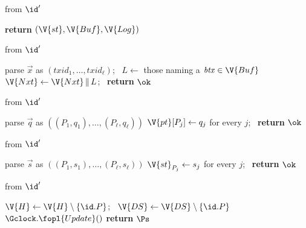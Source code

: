\begin{interface}
{ \quad from $\id'$
\begin{algorithmic}[1]
\algcont
{}
\State \textbf{return} $(\V{st}, \V{Buf}, \V{Log})$ \label{ln:gledadvread}
\algsave
\end{algorithmic}
\vspace{1.4ex}

 \quad from $\id'$
\begin{algorithmic}[1]
\algcont
{}
\State parse $\vec{x}$ as $(\mathit{txid}_1, \ldots, \mathit{txid}_\ell)$; \ $L \gets$ those naming a $\mathit{btx} \in \V{Buf}$ \label{ln:gledpropose}
\State $\V{Nxt} \gets \V{Nxt} \, \| \, L$; \ \textbf{return} $\ok$
\algsave
\end{algorithmic}
\vspace{1.4ex}

 \quad from $\id'$
\begin{algorithmic}[1]
\algcont
{}
\State parse $\vec{q}$ as $((P_1,q_1), \ldots, (P_\ell,q_\ell))$
 \label{ln:gledslack}
\State $\V{pt}[P_j] \gets q_j$ for every $j$; \ \textbf{return} $\ok$
\algsave
\end{algorithmic}
\vspace{1.4ex}

 \quad from $\id'$
\begin{algorithmic}[1]
\algcont
{}
\State parse $\vec{s}$ as $((P_1,s_1), \ldots, (P_\ell,s_\ell))$
\State $\V{st}_{P_j} \gets s_j$ for every $j$; \ \textbf{return} $\ok$ \label{ln:gleddesyncset}
\algsave
\end{algorithmic}
\vspace{1.4ex}

 \quad from $\id'$
\begin{algorithmic}[1]
\algcont
\State $\V{H} \gets \V{H} \setminus \{\id.P\}$; \ $\V{DS} \gets \V{DS} \setminus \{\id.P\}$ \label{ln:gledcorrupt}
  \State $\Gclock.\fopl{Update}()$ \label{ln:gledcorrupttick}
\EndIf
\State \textbf{return} $\Ps$ \label{ln:gledregistered}
\algsave
\end{algorithmic}}
\end{interface}
